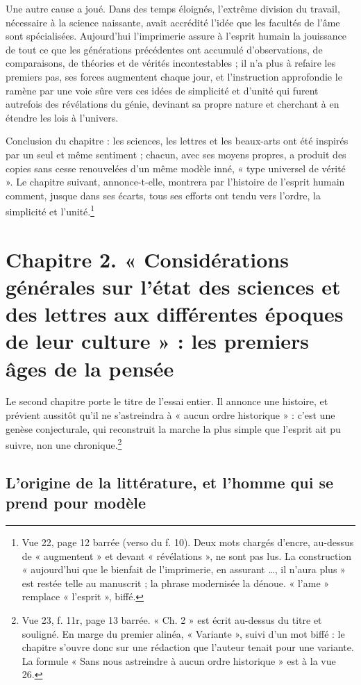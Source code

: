 \documentclass[11pt,a4paper]{article}
\begin{document}
Une autre cause a joué. Dans des temps éloignés, l'extrême division du travail,
nécessaire à la science naissante, avait accrédité l'idée que les facultés de
l'âme sont spécialisées. Aujourd'hui l'imprimerie assure à l'esprit humain la
jouissance de tout ce que les générations précédentes ont accumulé
d'observations, de comparaisons, de théories et de vérités incontestables ; il
n'a plus à refaire les premiers pas, ses forces augmentent chaque jour, et
l'instruction approfondie le ramène par une voie sûre vers ces idées de
simplicité et d'unité qui furent autrefois des révélations du génie, devinant
sa propre nature et cherchant à en étendre les lois à l'univers.

Conclusion du chapitre : les sciences, les lettres et les beaux-arts ont été
inspirés par un seul et même sentiment ; chacun, avec ses moyens propres, a
produit des copies sans cesse renouvelées d'un même modèle inné, « type
universel de vérité ». Le chapitre suivant, annonce-t-elle, montrera par
l'histoire de l'esprit humain comment, jusque dans ses écarts, tous ses efforts
ont tendu vers l'ordre, la simplicité et l'unité.\footnote{Vue 22, page 12
barrée (verso du f. 10). Deux mots chargés d'encre, au-dessus de « augmentent »
et devant « révélations », ne sont pas lus. La construction « aujourd'hui que le
bienfait de l'imprimerie, en assurant \ldots{}, il n'aura plus » est restée
telle au manuscrit ; la phrase modernisée la dénoue. « l'ame » remplace
« l'esprit », biffé.}

\section*{Chapitre 2. « Considérations générales sur l'état des sciences et des lettres aux différentes époques de leur culture » : les premiers âges de la pensée}

Le second chapitre porte le titre de l'essai entier. Il annonce une histoire,
et prévient aussitôt qu'il ne s'astreindra à « aucun ordre historique » : c'est
une genèse conjecturale, qui reconstruit la marche la plus simple que l'esprit
ait pu suivre, non une chronique.\footnote{Vue 23, f. 11r, page 13 barrée.
« Ch. 2 » est écrit au-dessus du titre et souligné. En marge du premier
alinéa, « Variante », suivi d'un mot biffé : le chapitre s'ouvre donc sur une
rédaction que l'auteur tenait pour une variante. La formule « Sans nous
astreindre à aucun ordre historique » est à la vue 26.}

\subsection*{L'origine de la littérature, et l'homme qui se prend pour modèle}
\end{document}
